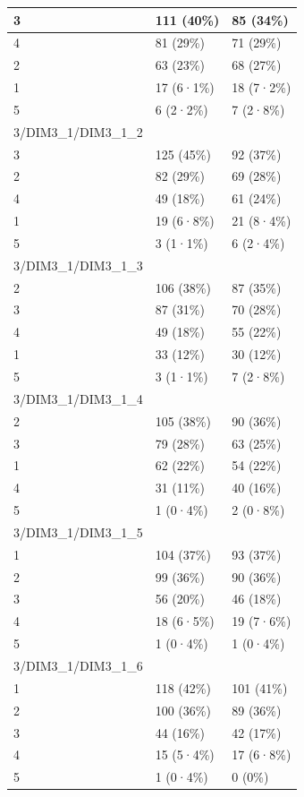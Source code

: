 \documentclass[
]{book}
\begin{document}
\begin{tabular}{l|l|l}
\hline
3 & 111 (40\%) & 85 (34\%)\\
\hline
4 & 81 (29\%) & 71 (29\%)\\
\hline
2 & 63 (23\%) & 68 (27\%)\\
\hline
1 & 17 (6·1\%) & 18 (7·2\%)\\
\hline
5 & 6 (2·2\%) & 7 (2·8\%)\\
\hline
3/DIM3\_1/DIM3\_1\_2 &  & \\
\hline
3 & 125 (45\%) & 92 (37\%)\\
\hline
2 & 82 (29\%) & 69 (28\%)\\
\hline
4 & 49 (18\%) & 61 (24\%)\\
\hline
1 & 19 (6·8\%) & 21 (8·4\%)\\
\hline
5 & 3 (1·1\%) & 6 (2·4\%)\\
\hline
3/DIM3\_1/DIM3\_1\_3 &  & \\
\hline
2 & 106 (38\%) & 87 (35\%)\\
\hline
3 & 87 (31\%) & 70 (28\%)\\
\hline
4 & 49 (18\%) & 55 (22\%)\\
\hline
1 & 33 (12\%) & 30 (12\%)\\
\hline
5 & 3 (1·1\%) & 7 (2·8\%)\\
\hline
3/DIM3\_1/DIM3\_1\_4 &  & \\
\hline
2 & 105 (38\%) & 90 (36\%)\\
\hline
3 & 79 (28\%) & 63 (25\%)\\
\hline
1 & 62 (22\%) & 54 (22\%)\\
\hline
4 & 31 (11\%) & 40 (16\%)\\
\hline
5 & 1 (0·4\%) & 2 (0·8\%)\\
\hline
3/DIM3\_1/DIM3\_1\_5 &  & \\
\hline
1 & 104 (37\%) & 93 (37\%)\\
\hline
2 & 99 (36\%) & 90 (36\%)\\
\hline
3 & 56 (20\%) & 46 (18\%)\\
\hline
4 & 18 (6·5\%) & 19 (7·6\%)\\
\hline
5 & 1 (0·4\%) & 1 (0·4\%)\\
\hline
3/DIM3\_1/DIM3\_1\_6 &  & \\
\hline
1 & 118 (42\%) & 101 (41\%)\\
\hline
2 & 100 (36\%) & 89 (36\%)\\
\hline
3 & 44 (16\%) & 42 (17\%)\\
\hline
4 & 15 (5·4\%) & 17 (6·8\%)\\
\hline
5 & 1 (0·4\%) & 0 (0\%)\\

\end{tabular}
\end{document}
